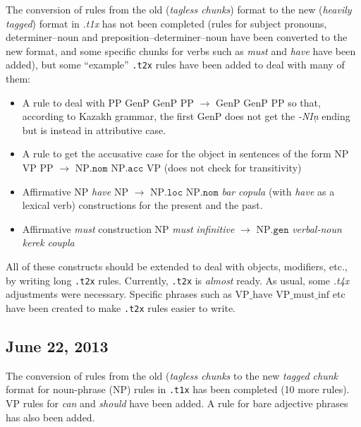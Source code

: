 \documentclass{article}
\begin{document}
The conversion of rules from the old (\emph{tagless chunks}) format to the new (\emph{heavily tagged}) format in \emph{.t1x} has not been completed (rules for subject pronouns, determiner--noun and preposition--determiner--noun have been converted to the new format, and some specific chunks for verbs such as \emph{must} and \emph{have} have been added), but some ``example'' \texttt{.t2x} rules have been added to deal with many of them:
\begin{itemize}
\item A rule to deal with  \(\mathrm{PP}\) \(\mathrm{GenP}\) \(\mathrm{GenP}\) \(\mathrm{PP}\) \(\to\) \(\mathrm{GenP}\) \(\mathrm{GenP}\) \(\mathrm{PP}\) so that, according to Kazakh grammar, the first \(\mathrm{GenP}\) does not get the \emph{-NI\c{n}} ending but is instead in attributive case.
\item A rule to get the accusative case for the object in sentences of the form \(\mathrm{NP}\) \(\mathrm{VP}\) \(\mathrm{PP}\) \(\to\) \(\mathrm{NP}\mathtt{.nom}\) \(\mathrm{NP}\mathtt{.acc}\) \(\mathrm{VP}\) (does not check for transitivity)
\item Affirmative \(\mathrm{NP}\) \emph{have} \(\mathrm{NP}\) \(\to\) \(\mathrm{NP}\mathtt{.loc}\) \(\mathrm{NP}\mathtt{.nom}\) \emph{bar} \emph{copula} (with \emph{have} as a lexical verb) constructions for the present and the past.
\item Affirmative \emph{must} construction \(\mathrm{NP}\) \emph{must} \emph{infinitive} \(\to\) \(\mathrm{NP}\mathtt{.gen}\) \emph{verbal-noun} \emph{kerek} \emph{coupla}
\end{itemize}
All of these constructs should be extended to deal with objects, modifiers, etc., by writing long \texttt{.t2x} rules. Currently, \texttt{.t2x} is \emph{almost} ready.
As usual, some \emph{.t4x} adjustments were necessary. Specific phrases such as \(\mathrm{VP\_have}\)
\(\mathrm{VP\_must\_inf}\) etc have been created to make \texttt{.t2x} rules easier to write.

\subsection{June 22, 2013}
The conversion of rules from the old (\emph{tagless chunks} to the new
\emph{tagged chunk} format for noun-phrase (NP) rules in \texttt{.t1x}
has been completed (10 more rules). VP rules for \emph{can} and
\emph{should} have been added. A rule for bare adjective phrases has
also been added.
\end{document}
